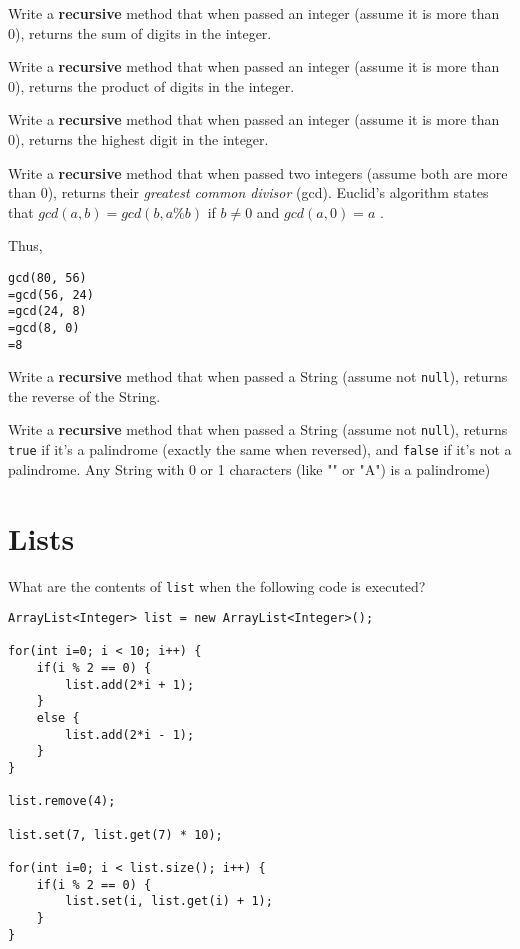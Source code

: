 \documentclass[11pt]{exam}
\begin{document}
\begin{questions}
\question Write a \textbf{recursive} method that when passed an integer (assume it is more than 0), returns the sum of digits in the integer. 

\question Write a \textbf{recursive} method that when passed an integer (assume it is more than 0), returns the product of digits in the integer. 

\question Write a \textbf{recursive} method that when passed an integer (assume it is more than 0), returns the highest digit in the integer.

\question Write a \textbf{recursive} method that when passed two integers (assume both are more than 0), returns their \emph{greatest common divisor} (gcd). Euclid's algorithm states that $gcd(a, b) = gcd(b, a\%b)$ if $b \neq 0$ and $gcd(a, 0) = a$ .

Thus,

\begin{verbatim}
gcd(80, 56)
=gcd(56, 24)
=gcd(24, 8)
=gcd(8, 0)
=8
\end{verbatim}

\question Write a \textbf{recursive} method that when passed a String (assume not \texttt{null}), returns the reverse of the String.

\question Write a \textbf{recursive} method that when passed a String (assume not \texttt{null}), returns \texttt{true} if it's a palindrome (exactly the same when reversed), and \texttt{false} if it's not a palindrome. Any String with 0 or 1 characters (like "" or "A") is a palindrome)

\newpage \section{Lists}


\question What are the contents of \texttt{list} when the following code is executed?

\begin{lstlisting}
ArrayList<Integer> list = new ArrayList<Integer>();

for(int i=0; i < 10; i++) {
    if(i % 2 == 0) {
        list.add(2*i + 1);	
    }
    else {
        list.add(2*i - 1);
    }
}

list.remove(4);

list.set(7, list.get(7) * 10);

for(int i=0; i < list.size(); i++) {
    if(i % 2 == 0) {
        list.set(i, list.get(i) + 1);
    }
}
\end{lstlisting}



\end{questions}
\end{document}
